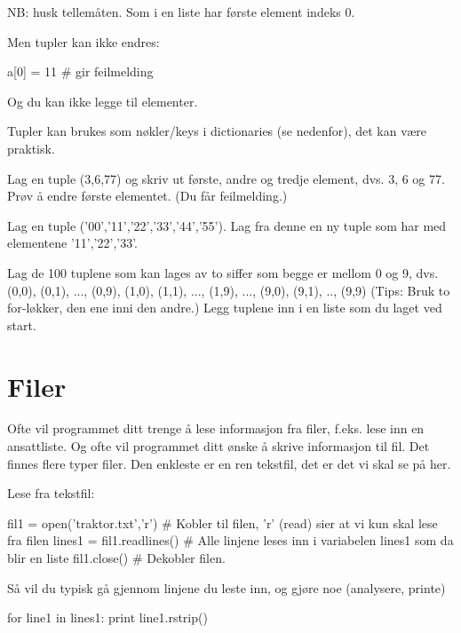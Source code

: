 NB: husk tellemåten. Som i en liste har første element indeks 0. 

Men tupler kan ikke endres:
\begin{usncodebox}
a[0] = 11  # gir feilmelding
\end{usncodebox}

Og du kan ikke legge til elementer. 

Tupler kan brukes som nøkler/keys i dictionaries (se nedenfor), det kan være praktisk. 

\begin{exercise}
Lag en tuple (3,6,77) og skriv ut første, andre og tredje element, dvs. 3, 6 og 77.
Prøv å endre første elementet. (Du får feilmelding.) 
\end{exercise}

\begin{exercise}
Lag en tuple ('00','11','22','33','44','55'). Lag fra denne en ny tuple som har med elementene '11','22','33'. 
\end{exercise}

\begin{exercise}
Lag de 100 tuplene som kan lages av to siffer som begge er mellom 0 og 9, dvs. (0,0), (0,1), ..., (0,9), (1,0), (1,1), ..., (1,9), ..., (9,0), (9,1), .., (9,9)
(Tips: Bruk to for-løkker, den ene inni den andre.)
Legg tuplene inn i en liste som du laget ved start.
\end{exercise}

\section{Filer}

Ofte vil programmet ditt trenge å lese informasjon fra filer, f.eks. lese inn en ansattliste. Og ofte vil programmet ditt ønske å skrive informasjon til fil. Det finnes flere typer filer. Den enkleste er en ren tekstfil, det er det vi skal se på her. 

Lese fra tekstfil:
\begin{usncodebox}
fil1 = open('traktor.txt','r')    # Kobler til filen, 'r' (read) sier at vi kun skal lese fra filen
lines1 = fil1.readlines()         # Alle linjene leses inn i variabelen lines1 som da blir en liste
fil1.close()                      # Dekobler filen. 
\end{usncodebox}

Så vil du typisk gå gjennom linjene du leste inn, og gjøre noe (analysere, printe)
\begin{usncodebox}
for line1 in lines1:
    print line1.rstrip()
\end{usncodebox}


